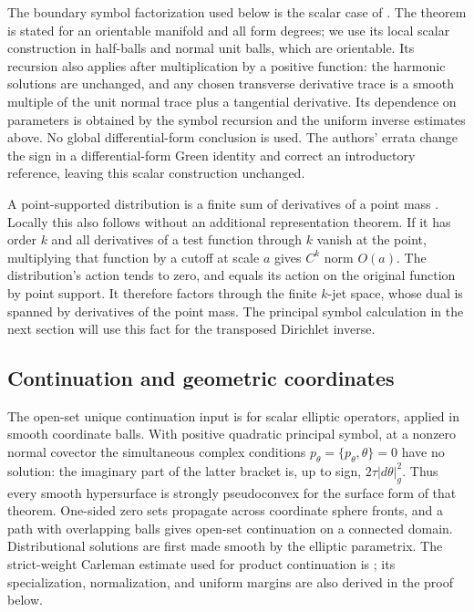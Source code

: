 The boundary symbol factorization used below is the scalar case of
\citep[Theorem~1.1(i)--(ii) and Proposition~3.1]{JoshiLionheart2005}.
The theorem is stated for an orientable manifold and all form degrees;
we use its local scalar construction in half-balls and normal unit balls,
which are orientable. Its recursion also applies after multiplication
by a positive function: the harmonic solutions are unchanged, and any
chosen transverse derivative trace is a smooth multiple of the unit
normal trace plus a tangential derivative. Its dependence on parameters
is obtained by the symbol recursion and the uniform inverse estimates
above. No global differential-form conclusion is used. The authors'
errata change the sign in a differential-form Green identity and correct
an introductory reference, leaving this scalar construction unchanged.

A point-supported distribution is a finite sum of derivatives of a
point mass \citep[Proposition~4.5]{TaylorFourier}. Locally this also follows
without an additional representation theorem. If it has order $k$ and
all derivatives of a test function through $k$ vanish at the point,
multiplying that function by a cutoff at scale $a$ gives $C^k$ norm
$O(a)$. The distribution's action tends to zero, and equals its action
on the original function by point support. It therefore factors through
the finite $k$-jet space, whose dual is spanned by derivatives of the
point mass. The principal symbol calculation in the next section will
use this fact for the transposed Dirichlet inverse.

\subsection{Continuation and geometric coordinates}
The open-set unique continuation input is
\citep[Theorem~8, Definitions~8.1--8.3]{KochTataru2005} for scalar elliptic
operators, applied in smooth coordinate balls. With positive quadratic
principal symbol, at a nonzero normal covector the simultaneous complex
conditions $p_\theta=\{p_\theta,\theta\}=0$ have no solution:
the imaginary part of the latter bracket is, up to sign,
$2\tau|d\theta|_g^2$. Thus every smooth hypersurface is strongly
pseudoconvex for the surface form of that theorem. One-sided zero sets
propagate across coordinate sphere fronts, and a path with overlapping
balls gives open-set continuation on a connected domain. Distributional
solutions are first made smooth by the elliptic parametrix.
The strict-weight Carleman estimate used for product continuation is
\citep[Definition~8.3 and Theorem~9(a)]{KochTataru2005}; its specialization,
normalization, and uniform margins are also derived in the proof below.

